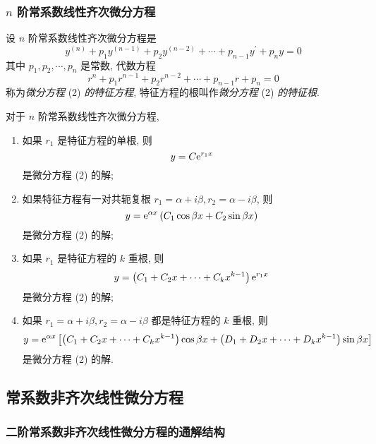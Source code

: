 \subsubsection{$n$ 阶常系数线性齐次微分方程}

\begin{definition}[特征方程与特征根]
    设 $ n $ 阶常系数线性齐次微分方程是
    \begin{equation*}
        y^{(n)}+p_{1} y^{(n-1)}+p_{2} y^{(n-2)}+\cdots+p_{n-1} y^{\prime}+p_{n} y=0
        \tag{2}
    \end{equation*}
    其中 $ p_{1}, p_{2}, \cdots, p_{n} $ 是常数, 代数方程
    $$r^{n}+p_{1} r^{n-1}+p_{2} r^{n-2}+\cdots+p_{n-1} r+p_{n}=0$$
    称为\textit{微分方程} (2) \textit{的特征方程}, 特征方程的根叫作\textit{微分方程} (2) \textit{的特征根}.
\end{definition}

\begin{theorem}[$n$ 阶常系数线性齐次微分方程通解结构]
    对于 $n$ 阶常系数线性齐次微分方程,
    \begin{enumerate}[label=(\arabic{*})]
        \item 如果 $ r_{1} $ 是特征方程的单根, 则
              $$y=C \mathrm{e}^{r_{1} x}$$
              是微分方程 (2) 的解;
        \item 如果特征方程有一对共轭复根 $ r_{1}=\alpha+i \beta, r_{2}=\alpha-i \beta$, 则
              $$y=\mathrm{e}^{\alpha x}\left(C_{1} \cos \beta x+C_{2} \sin \beta x\right)$$
              是微分方程 (2) 的解;
        \item 如果 $ r_{1} $ 是特征方程的 $ k $ 重根, 则
              $$y=\left(C_{1}+C_{2} x+\cdots+C_{k} x^{k-1}\right) \mathrm{e}^{r_{1} x}$$
              是微分方程 (2) 的解;
        \item 如果 $ r_{1}=\alpha+i \beta, r_{2}=\alpha-i \beta $ 都是特征方程的 $ k $ 重根, 则
              $$y=\mathrm{e}^{\alpha x}\left[\left(C_{1}+C_{2} x+\cdots+C_{k} x^{k-1}\right) \cos \beta x+\left(D_{1}+D_{2} x+\cdots+D_{k} x^{k-1}\right) \sin \beta x\right]$$
              是微分方程 (2) 的解.
    \end{enumerate}
\end{theorem}

\subsection{常系数非齐次线性微分方程}

\subsubsection{二阶常系数非齐次线性微分方程的通解结构}

